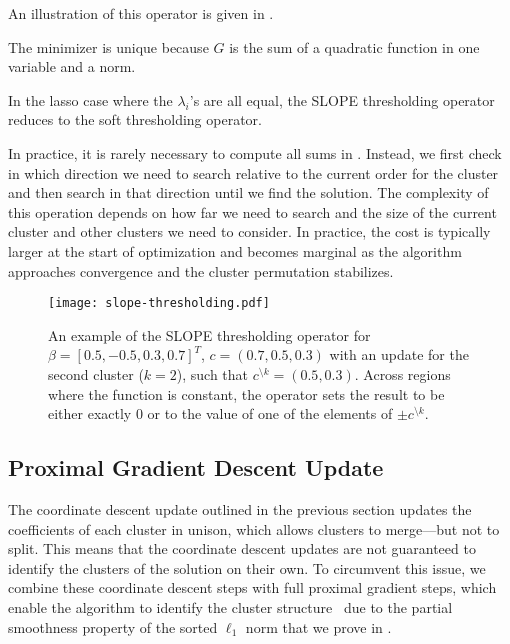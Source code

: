 An illustration of this operator is given in .
\begin{remark}
  The minimizer is unique because \(G\) is the sum of a quadratic function in one variable and a norm.
\end{remark}

\begin{remark}
  In the lasso case where the $\lambda_i$'s are all equal, the SLOPE thresholding operator reduces to the soft thresholding operator.
\end{remark}

In practice, it is rarely necessary to compute all sums in .
Instead, we first check in which direction we need to search relative to the current order for the cluster and then search in that direction until we find the solution.
The complexity of this operation depends on how far we need to search and the size of the current cluster and other clusters we need to consider.
In practice, the cost is typically larger at the start of optimization and becomes marginal as the algorithm approaches convergence and the cluster permutation stabilizes.

\begin{figure*}[htb]
  \centering
  \texttt{[image: slope-thresholding.pdf]}
  \caption{%
  An example of the SLOPE thresholding operator for \(\beta = [0.5, -0.5, 0.3, 0.7]^T\), \(c = (0.7, 0.5, 0.3)\)
  with an update for the second cluster (\(k = 2\)), such that
  \(c^{\setminus k} = (0.5, 0.3)\). Across regions where the function is constant,
  the operator sets the result to be either exactly 0 or to the value of one
  of the elements of \(\pm c^{\setminus k}\).
  }
  \label{fig:slope-thresholding}
\end{figure*}

\subsection{Proximal Gradient Descent Update}
\label{sec:pgd-update}

The coordinate descent update outlined in the previous section updates the coefficients of each cluster in unison, which allows clusters to merge---but not to split.
This means that the coordinate descent updates are not guaranteed to identify the clusters of the solution on their own.
To circumvent this issue, we combine these coordinate descent steps with full proximal gradient steps, which enable the algorithm to identify the cluster structure~\parencite{Liang2014} due to the partial smoothness property of the sorted \(\ell_1\) norm that we prove in .

